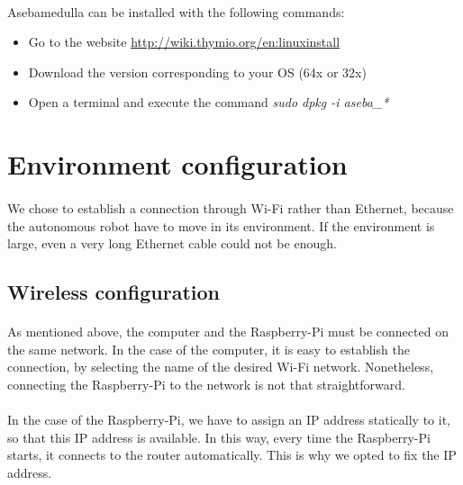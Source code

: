 \documentclass[12pt]{report}
\begin{document}
\paragraph{}
Asebamedulla can be installed with the following commands:
\begin{itemize}
	\item Go to the website \url{http://wiki.thymio.org/en:linuxinstall}
	\item Download the version corresponding to your OS (64x or 32x)
	\item Open a terminal and execute the command \emph{sudo dpkg -i aseba\_*}
\end{itemize}
\section{Environment configuration}
\paragraph{}
We chose to establish a connection through Wi-Fi rather than Ethernet, because the autonomous robot have to move in its environment. If the environment is large, even a very long Ethernet cable could not be enough.

\subsection{Wireless configuration}
\paragraph{}
As mentioned above, the computer and the Raspberry-Pi must be connected on the same network. In the case of the computer, it is easy to establish the connection, by selecting the name of the desired Wi-Fi network. Nonetheless, connecting the Raspberry-Pi to the network is not that straightforward.
\paragraph{}
In the case of the Raspberry-Pi, we have to assign an IP address statically to it, so that this IP address is available. In this way, every time the Raspberry-Pi starts, it connects to the router automatically. This is why we opted to fix the IP address. 
\end{document}
